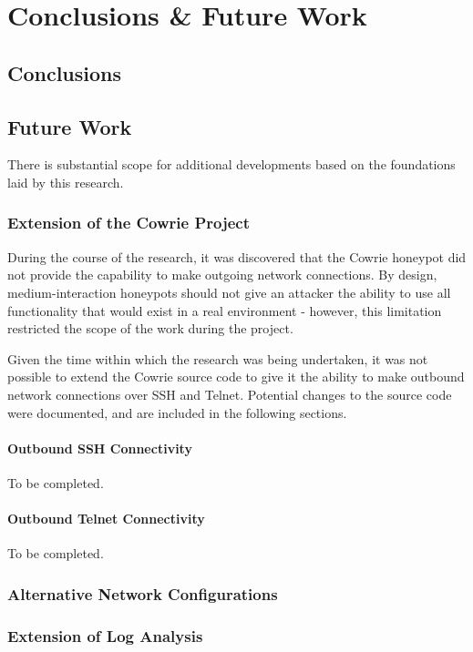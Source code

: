 

\chapter{Conclusions \& Future Work}

\section{Conclusions}

\section{Future Work}

There is substantial scope for additional developments based on the foundations laid by this research.

\subsection{Extension of the Cowrie Project}

During the course of the research, it was discovered that the Cowrie honeypot did not provide the capability to make outgoing network connections. By design, medium-interaction honeypots should not give an attacker the ability to use all functionality that would exist in a real environment - however, this limitation restricted the scope of the work during the project.

Given the time within which the research was being undertaken, it was not possible to extend the Cowrie source code to give it the ability to make outbound network connections over SSH and Telnet. Potential changes to the source code were documented, and are included in the following sections.

\subsubsection{Outbound SSH Connectivity}
To be completed.

\subsubsection{Outbound Telnet Connectivity}
To be completed.

\subsection{Alternative Network Configurations}

\subsection{Extension of Log Analysis}